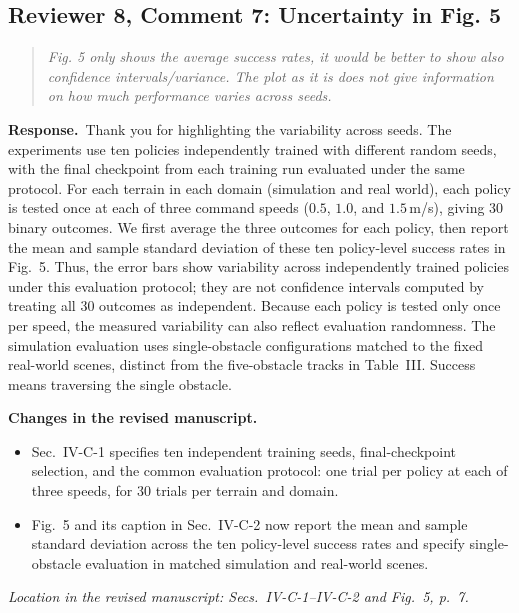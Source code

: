 \documentclass[11pt]{article}
\newenvironment{reviewcomment}{\begin{quote}\color{reviewblue}\itshape}{\end{quote}}
\newcommand{\Response}{\par\noindent\textbf{Response.}\ }
\newcommand{\Changes}{\par\noindent\textbf{Changes in the revised manuscript.}\ }
\newcommand{\Location}[1]{\par\noindent\textit{Location in the revised manuscript: #1}}
\begin{document}
\subsection*{Reviewer 8, Comment 7: Uncertainty in Fig. 5}
\begin{reviewcomment}
Fig. 5 only shows the average success rates, it would be better to show also confidence intervals/variance. The plot as it is does not give information on how much performance varies across seeds.
\end{reviewcomment}
\Response Thank you for highlighting the variability across seeds. The experiments use ten policies independently trained with different random seeds, with the final checkpoint from each training run evaluated under the same protocol. For each terrain in each domain (simulation and real world), each policy is tested once at each of three command speeds ($0.5$, $1.0$, and $1.5$\,m/s), giving 30 binary outcomes. We first average the three outcomes for each policy, then report the mean and sample standard deviation of these ten policy-level success rates in Fig.~5. Thus, the error bars show variability across independently trained policies under this evaluation protocol; they are not confidence intervals computed by treating all 30 outcomes as independent. Because each policy is tested only once per speed, the measured variability can also reflect evaluation randomness. The simulation evaluation uses single-obstacle configurations matched to the fixed real-world scenes, distinct from the five-obstacle tracks in Table~III. Success means traversing the single obstacle.
\Changes
\begin{itemize}
    \item Sec.~IV-C-1 specifies ten independent training seeds, final-checkpoint selection, and the common evaluation protocol: one trial per policy at each of three speeds, for 30 trials per terrain and domain.
    \item Fig.~5 and its caption in Sec.~IV-C-2 now report the mean and sample standard deviation across the ten policy-level success rates and specify single-obstacle evaluation in matched simulation and real-world scenes.
\end{itemize}
\Location{Secs.~IV-C-1--IV-C-2 and Fig.~5, p.~7.}
\end{document}
